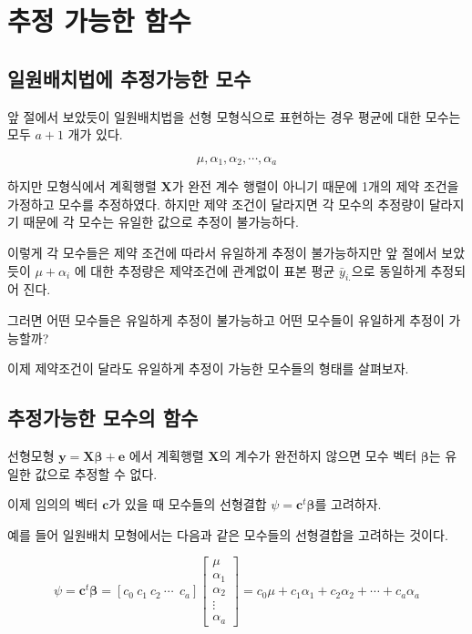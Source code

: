 \documentclass[
]{book}
\theoremstyle{definition}
\theoremstyle{definition}
\theoremstyle{definition}
\theoremstyle{definition}
\theoremstyle{remark}
\begin{document}
\hypertarget{uxcd94uxc815-uxac00uxb2a5uxd55c-uxd568uxc218}{%
\section{추정 가능한 함수}\label{uxcd94uxc815-uxac00uxb2a5uxd55c-uxd568uxc218}}

\hypertarget{uxc77cuxc6d0uxbc30uxce58uxbc95uxc5d0-uxcd94uxc815uxac00uxb2a5uxd55c-uxbaa8uxc218}{%
\subsection{일원배치법에 추정가능한 모수}\label{uxc77cuxc6d0uxbc30uxce58uxbc95uxc5d0-uxcd94uxc815uxac00uxb2a5uxd55c-uxbaa8uxc218}}

앞 절에서 보았듯이 일원배치법을 선형 모형식으로 표현하는 경우 평균에 대한 모수는 모두 \(a+1\) 개가 있다.

\[ \mu, \alpha_1, \alpha_2, \cdots, \alpha_a \]

하지만 모형식에서 계획행렬 \(\bm X\)가 완전 계수 행렬이 아니기 때문에 1개의 제약 조건을 가정하고 모수를 추정하였다.
하지만 제약 조건이 달라지면 각 모수의 추정량이 달라지기 때문에 각 모수는 유일한 값으로 추정이 불가능하다.

이렇게 각 모수들은 제약 조건에 따라서 유일하게 추정이 불가능하지만 앞 절에서 보았듯이 \(\mu + \alpha_i\) 에 대한 추정량은 제약조건에 관계없이
표본 평균 \(\bar y_{i.}\)으로 동일하게 추정되어 진다.

그러면 어떤 모수들은 유일하게 추정이 불가능하고 어떤 모수들이 유일하게 추정이 가능할까?

이제 제약조건이 달라도 유일하게 추정이 가능한 모수들의 형태를 살펴보자.

\hypertarget{uxcd94uxc815uxac00uxb2a5uxd55c-uxbaa8uxc218uxc758-uxd568uxc218}{%
\subsection{추정가능한 모수의 함수}\label{uxcd94uxc815uxac00uxb2a5uxd55c-uxbaa8uxc218uxc758-uxd568uxc218}}

선형모형 \(\bm y =\bm X \bm \beta + \bm e\) 에서 계획행렬 \(\bm X\)의 계수가 완전하지 않으면 모수 벡터 \(\bm \beta\)는 유일한 값으로 추정할 수 없다.

이제 임의의 벡터 \(\bm c\)가 있을 때 모수들의 선형결합 \(\psi = \bm c^t \bm \beta\)를 고려하자.

예를 들어 일원배치 모형에서는 다음과 같은 모수들의 선형결합을 고려하는 것이다.

\[ \psi = \bm c^t \bm \beta = 
[ c_0~ c_1~ c_2~ \cdots~~c_a] 
\begin{bmatrix}
\mu \\
\alpha_1 \\
\alpha_2 \\
\vdots \\
\alpha_a
\end{bmatrix}
=c_0 \mu + c_1 \alpha_1 + c_2 \alpha_2 + \cdots + c_a \alpha_a \]
\end{document}
